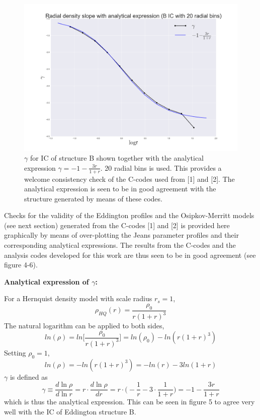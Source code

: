 \begin{figure}[!htbp]
\centering
\includegraphics[width=1.0\linewidth]{img/B_IC_gamma_logr_fit.png}
\caption{$\gamma$ for IC of structure B shown together with the analytical expression $\gamma = -1-\frac{3r}{1+r}$. 20 radial bins is used. This provides a welcome consistency check of the C-codes used from [1] and [2]. The analytical expression is seen to be in good agreement with the structure generated by means of these codes.}
\label{fig:test}
\end{figure}

Checks for the validity of the Eddington profiles and the Osipkov-Merritt models (see next section) generated from the C-codes [1] and [2] is provided here graphically by means of over-plotting the Jeans parameter profiles and their corresponding analytical expressions. The results from the C-codes and the analysis codes developed for this work are thus seen to be in good agreement (see figure 4-6).

\centerline{\textbf{Analytical expression of $\gamma$:}}
For a Hernquist density model with scale radius $r_s = 1$,
\begin{equation} 
\rho_{HQ}(r) = \frac{\rho_0}{r(1+r)^3}  
\end{equation}
The natural logarithm can be applied to both sides,
\begin{equation} 
ln(\rho) = ln \Bigg[ \frac{\rho_0}{r(1+r)^3} \Bigg] = ln(\rho_0) - ln(r(1+r)^3)
\end{equation}
Setting $\rho_0 = 1$,
\begin{equation} 
ln(\rho) = - ln(r(1+r)^3) = - ln(r) -3ln(1+r)
\end{equation}
$\gamma$ is defined as 
\begin{equation}
\gamma \equiv \frac{d\ln\rho}{d\ln r} = r\cdot \frac{d\ln\rho}{dr} = 
r\cdot \Bigg( -\frac{1}{r}-3\cdot \frac{1}{1+r} \Bigg) =
-1-\frac{3r}{1+r}
\end{equation}
which is thus the analytical expression.
This can be seen in figure 5 to agree very well with the IC of Eddington structure B.


